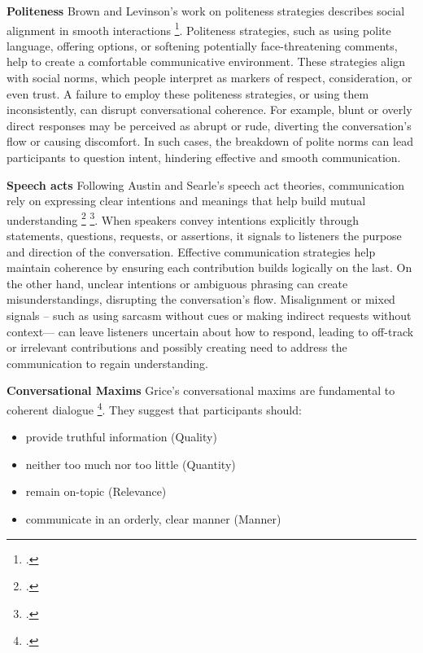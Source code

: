 \documentclass[12pt]{report}
\begin{document}
\par{\textbf{Politeness}
Brown and Levinson’s work on politeness strategies describes social alignment in smooth interactions \footcite{brown1987politeness}. Politeness strategies, such as using polite language, offering options, or softening potentially face-threatening comments, help to create a comfortable communicative environment. These strategies align with social norms, which people interpret as markers of respect, consideration, or even trust. A failure to employ these politeness strategies, or using them inconsistently, can disrupt conversational coherence. For example, blunt or overly direct responses may be perceived as abrupt or rude, diverting the conversation's flow or causing discomfort. In such cases, the breakdown of polite norms can lead participants to question intent, hindering effective and smooth communication.


\par{\textbf{Speech acts}}
Following Austin and Searle's speech act theories, communication rely on expressing clear intentions and meanings that help build mutual understanding \footcite{austin1962how} \footcite{searle1969speech}. When speakers convey intentions explicitly through statements, questions, requests, or assertions, it signals to listeners the purpose and direction of the conversation. Effective communication strategies help maintain coherence by ensuring each contribution builds logically on the last. On the other hand, unclear intentions or ambiguous phrasing can create misunderstandings, disrupting the conversation's flow. Misalignment or mixed signals – such as using sarcasm without cues or making indirect requests without context— can leave listeners uncertain about how to respond, leading to off-track or irrelevant contributions and possibly creating need to address the communication to regain understanding.

\par{\textbf{Conversational Maxims}}
Grice’s conversational maxims are fundamental to coherent dialogue \footcite{grice1975logic}.
They suggest that participants should:

\begin{itemize}
\item
provide truthful information (Quality)
\item
neither too much nor too little (Quantity)
\item
remain on-topic (Relevance)
\item
communicate in an orderly, clear manner (Manner)
\end{itemize}

}
\end{document}
